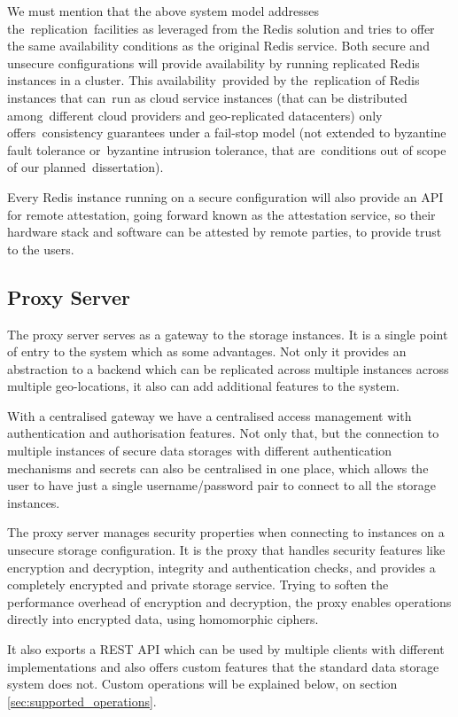 We must mention that the above system model addresses the replication facilities as leveraged from the Redis solution and tries to offer the same availability conditions as the original Redis service. Both secure and unsecure configurations will provide availability by running replicated Redis instances in a cluster. This availability provided by the replication of Redis instances that can run as cloud service instances (that can be distributed among different cloud providers and geo-replicated datacenters) only offers consistency guarantees under a fail-stop model (not extended to byzantine fault tolerance or byzantine intrusion tolerance, that are conditions out of scope of our planned dissertation).

Every Redis instance running on a secure configuration will also provide an API for remote attestation, going forward known as the attestation service, so their hardware stack and software can be attested by remote parties, to provide trust to the users.

\subsection{Proxy Server}
\label{ssec:system_model_proxy_server}

The proxy server serves as a gateway to the storage instances. It is a single point of entry to the system which as some advantages. Not only it provides an abstraction to a backend which can be replicated across multiple instances across multiple geo-locations, it also can add additional features to the system. 

With a centralised gateway we have a centralised access management with authentication and authorisation features. Not only that, but the connection to multiple instances of secure data storages with different authentication mechanisms and secrets can also be centralised in one place, which allows the user to have just a single username/password pair to connect to all the storage instances.

The proxy server manages security properties when connecting to instances on a unsecure storage configuration. It is the proxy that handles security features like encryption and decryption, integrity and authentication checks, and provides a completely encrypted and private storage service. Trying to soften the performance overhead of encryption and decryption, the proxy enables operations directly into encrypted data, using homomorphic ciphers. 

It also exports a \gls{REST} \gls{API} which can be used by multiple clients with different implementations and also offers custom features that the standard data storage system does not. Custom operations will be explained below, on section \ref{sec:supported_operations}.

